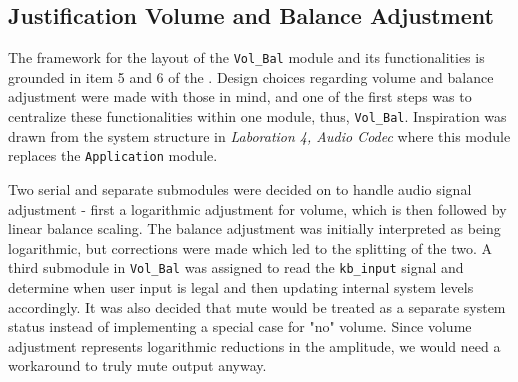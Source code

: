 
\subsection{Justification Volume and Balance Adjustment}

The framework for the layout of the \texttt{Vol\_Bal} module and its functionalities is grounded in item 5 and 6 of the \citeR{}. Design choices regarding volume and balance adjustment were made with those in mind, and one of the first steps was to centralize these functionalities within one module, thus, \texttt{Vol\_Bal}. Inspiration was drawn from the system structure in \emph{Laboration 4, Audio Codec} where this module replaces the \texttt{Application} module.
	
	
Two serial and separate submodules were decided on to handle audio signal adjustment - first a logarithmic adjustment for volume, which is then followed by linear balance scaling. The balance adjustment was initially interpreted as being logarithmic, but corrections were made which led to the splitting of the two. 
A third submodule in \texttt{Vol\_Bal} was assigned to read the \verb=kb_input= signal and determine when user input is legal and then updating internal system levels accordingly.
It was also decided that mute would be treated as a separate system status instead of implementing a special case for "no" volume. Since volume adjustment represents logarithmic reductions in the amplitude, we would need a workaround to truly mute output anyway.
	
